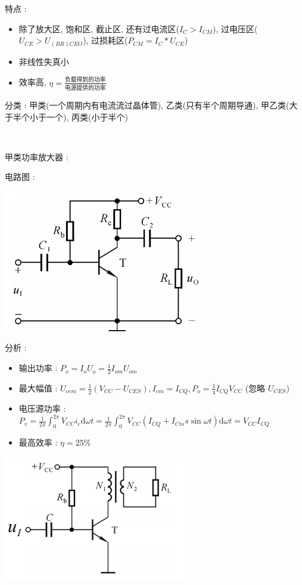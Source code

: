 \documentclass[UTF8, 12pt]{ctexart}
\begin{document}
	\noindent
	特点 :
	\begin{itemize}[leftmargin = 4em]
		\item 除了放大区, 饱和区, 截止区, 还有过电流区($ I_{C} > I_{CM} $), 过电压区($ U_{CE} > U_{(BR)CEO} $), 过损耗区($ P_{CM} = I_{C}*U_{CE} $)
		\item 非线性失真小
		\item 效率高, $ \eta = \frac{\text{负载得到的功率}}{\text{电源提供的功率}} $
	\end{itemize}

	分类 : 甲类(一个周期内有电流流过晶体管), 乙类(只有半个周期导通), 甲乙类(大于半个小于一个), 丙类(小于半个)

	~

	\noindent
	甲类功率放大器 :

	电路图 :

	\includegraphics[scale = 0.4]{04/甲类功率放大器电路图.png}

	分析 :
	\begin{itemize}[leftmargin = 4em]
		\item 输出功率 : $ P_{o} = I_{o}U_{o} = \frac{1}{2}I_{om}U_{om} $
		\item 最大幅值 : $ U_{cem} = \frac{1}{2}(V_{CC}-U_{CES}), I_{cm}=I_{CQ}, P_{o} = \frac{1}{4}I_{CQ}V_{CC} $ (忽略 $ U_{CES} $)
		\item 电压源功率 : $ P_{v} = \frac{1}{2\pi} \int_{0}^{2\pi}V_{CC}i_{c}\mathrm{d}\omega t = \frac{1}{2\pi} \int_{0}^{2\pi}V_{CC}(I_{CQ}+I_{Cm}s\sin\omega t)\mathrm{d}\omega t = V_{CC}I_{CQ} $
		\item 最高效率 : $ \eta = 25\% $
	\end{itemize}

	\includegraphics[scale = 0.4]{04/变压器耦合功率放大器电路图.png}
\end{document}
